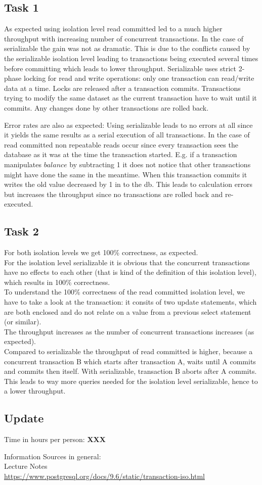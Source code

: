 \documentclass[11pt]{scrartcl}
\begin{document}
\subsection*{Task 1}
As expected using isolation level read committed led to a much higher throughput with increasing number of concurrent transactions. In the case of serializable the gain was not as dramatic. This is due to the conflicts caused by the serializable isolation level leading to transactions being executed several times before committing which leads to lower throughput.
Serializable uses strict 2-phase locking for read and write operations: only one transaction can read/write data at a time. Locks are released after a transaction commits. Transactions trying to modify the same dataset as the current transaction have to wait until it commits. Any changes done by other transactions are rolled back. 

Error rates are also as expected: Using serializable leads to no errors at all since it yields the same results as a serial execution of all transactions. In the case of read committed non repeatable reads occur since every transaction sees the database as it was at the time the transaction started. E.g. if a transaction manipulates $balance$ by subtracting 1 it does not notice that other transactions might have done the same in the meantime. When this transaction commits it writes the old value decreased by 1 in to the db. This leads to calculation errors but increases the throughput since no transactions are rolled back and re-executed.

\subsection*{Task 2}

For both isolation levels we get 100\% correctness, as expected.\\
For the isolation level serializable it is obvious that the concurrent transactions have no effects to each other (that is kind of the definition of this isolation level), which results in 100\% correctness.\\
To understand the 100\% correctness of the read committed isolation level, we have to take a look at the transaction: it consits of two update statements, which are both enclosed and do not relate on a value from a previous select statement (or similar).\\
The throughput increases as the number of concurrent transactions increases (as expected).\\
Compared to serializable the throughput of read committed is higher, because a concurrent transaction B which starts after transaction A, waits until A commits and commits then itself. With serializable, transaction B aborts after A commits. This leads to way more queries needed for the isolation level serializable, hence to a lower throughput.

\subsection*{Update}

\bigskip

\noindent Time in hours per person: {\bf XXX}

\bigskip

Information Sources in general:\\
Lecture Notes\\
\url{https://www.postgresql.org/docs/9.6/static/transaction-iso.html}
\end{document}
